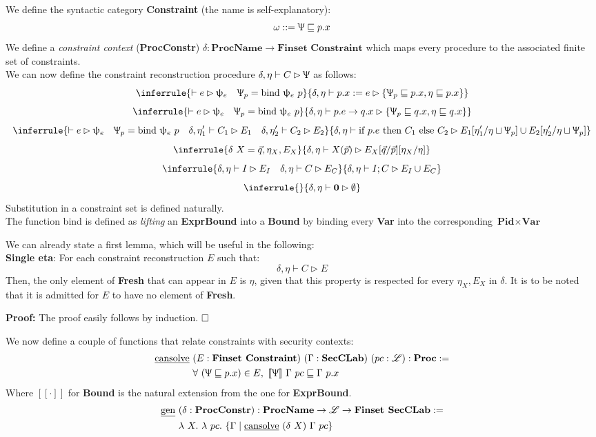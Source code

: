 \documentclass[12pt,a4paper,twoside]{book}
\newcommand{\llbracket}{[\![}
\newcommand{\rrbracket}{]\!]}
\newcommand{\MCL}{\mathscr{L}}
\newcommand{\qed}{\hfill\square}
\begin{document}
\noindent We define the syntactic category \textbf{Constraint} (the name is self-explanatory):
$$
\omega ::= \Uppsi \sqsubseteq p.x
$$
We define a \emph{constraint context} (\textbf{ProcConstr}) $\delta: \textbf{ProcName} \rightarrow \textbf{Finset Constraint}$ which maps every procedure to the associated finite set of constraints.\\
We can now define the constraint reconstruction procedure $\delta, \eta\vdash C\rhd\Uppsi$ as follows:
$$
\inferrule{\vdash e \rhd \uppsi_e\quad\Uppsi_p =\text{bind }\uppsi_e~p}
{\delta, \eta \vdash p.x := e \rhd \{\Uppsi_p \sqsubseteq p.x, \eta \sqsubseteq p.x\}}
$$
$$
\inferrule{\vdash e \rhd \uppsi_e\quad\Uppsi_p =\text{bind }\uppsi_e~p}
{\delta, \eta \vdash p.e \rightarrow q.x \rhd \{\Uppsi_p \sqsubseteq q.x, \eta \sqsubseteq q.x\}}
$$
$$
\inferrule{\vdash e \rhd \uppsi_e\quad\Uppsi_p =\text{bind }\uppsi_e~p\quad \delta,\eta_1'\vdash C_1 \rhd E_1 \quad \delta,\eta_2'\vdash C_2 \rhd E_2}
{\delta, \eta \vdash \text{if } p.e \text{ then } C_1 \text{ else } C_2 \rhd E_1[\eta_1' / \eta \sqcup \Uppsi_p] \cup E_2[\eta_2' / \eta \sqcup \Uppsi_p]}
$$
$$
\inferrule{\delta~X = \vec{q}, \eta_X, E_X}
{\delta, \eta \vdash X(\vec{p}) \rhd E_X[\vec{q}/\vec{p}][\eta_X/\eta]}
$$
$$
\inferrule{\delta, \eta \vdash I \rhd E_I \quad \delta, \eta \vdash C \rhd E_C}
{\delta, \eta \vdash I; C \rhd E_I \cup E_C}
$$
$$
\inferrule{}{\delta, \eta \vdash \boldsymbol{0} \rhd \emptyset}
$$
Substitution in a constraint set is defined naturally.\\
The function bind is defined as \emph{lifting} an \textbf{ExprBound} into a \textbf{Bound} by binding every \textbf{Var} into the corresponding $\textbf{Pid} \times \textbf{Var}$

We can already state a first lemma, which will be useful in the following:\\
\textbf{Single eta}: For each constraint reconstruction $E$ such that:
$$
\delta, \eta \vdash C \rhd E
$$
Then, the only element of \textbf{Fresh} that can appear in $E$ is $\eta$, given that this property is respected for every $\eta_X, E_X$ in $\delta$. It is to be noted that it is admitted for $E$ to have no element of \textbf{Fresh}.

\noindent\textbf{Proof:} The proof easily follows by induction. $\qed$

We now define a couple of functions that relate constraints with security contexts:
\begin{align*}
\text{\underline{cansolve}}~&(E: \textbf{Finset Constraint})~(\Gamma: \textbf{SecCLab})~(pc: \MCL): \textbf{Proc} :=\\
&\forall~(\Uppsi \sqsubseteq p.x) \in E,~\llbracket \Uppsi \rrbracket~\Gamma~pc \sqsubseteq \Gamma~p.x
\end{align*}
Where $\llbracket \cdot\rrbracket$ for \textbf{Bound} is the natural extension from the one for \textbf{ExprBound}.
\begin{align*}
\text{\underline{gen}}~&(\delta: \textbf{ProcConstr}): \textbf{ProcName} \rightarrow \MCL \rightarrow \textbf{Finset SecCLab} :=\\
&\lambda~X.~\lambda~pc.~\{ \Gamma \mid \text{\underline{cansolve}}~(\delta~X)~\Gamma~pc\}
\end{align*}
\end{document}
